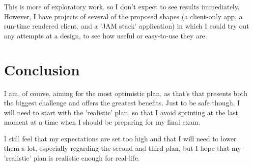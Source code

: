 \documentclass[11pt,a4paper]{scrartcl}
\begin{document}
This is more of exploratory work, so I don't expect to see results
immediately. However, I have projects of several of the proposed shapes (a
client-only app, a run-time rendered client, and a 'JAM stack' application) in
which I could try out any attempts at a design, to see how useful or easy-to-use
they are.

\section{Conclusion}
\label{sec:orgc177080}
I am, of course, aiming for the most optimistic plan, as that's that presents
both the biggest challenge and offers the greatest benefits. Just to be safe
though, I will need to start with the 'realistic' plan, so that I avoid
sprinting at the last moment at a time when I should be preparing for my final
exam.

I still feel that my expectations are set too high and that I will need to lower
them a lot, especially regarding the second and third plan, but I hope that my
'realistic' plan is realistic enough for real-life.
\end{document}
